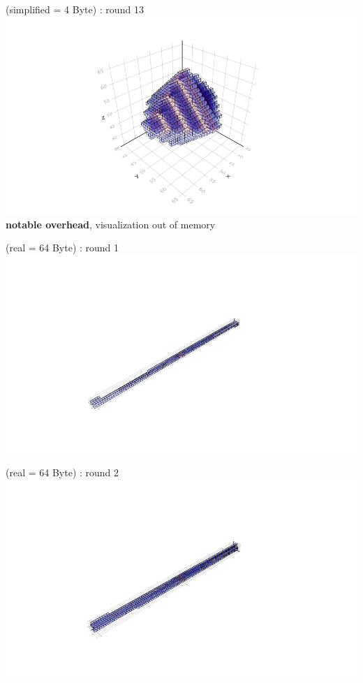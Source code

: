 \documentclass{beamer}
\begin{document}
\begin{frame}{\insertsubsection (simplified = 4 Byte) : round 13}
  \centering\includegraphics[trim=5cm 0.7cm 5cm 3cm, clip, width=1\linewidth]{algorithm_visualisation/srgcache4/srgcache_step12.png}\\
  \textbf{notable overhead}, visualization out of memory\\
\end{frame}
\begin{frame}{\insertsubsection (real = 64 Byte) : round 1}
  \centering\includegraphics[trim=5cm 0.7cm 5cm 3cm, clip, width=1\linewidth]{algorithm_visualisation/srgcache64/srgcache_step0.png}\\
\end{frame}
\begin{frame}{\insertsubsection (real = 64 Byte) : round 2}
  \centering\includegraphics[trim=5cm 0.7cm 5cm 3cm, clip, width=1\linewidth]{algorithm_visualisation/srgcache64/srgcache_step1.png}\\
\end{frame}
\end{document}
